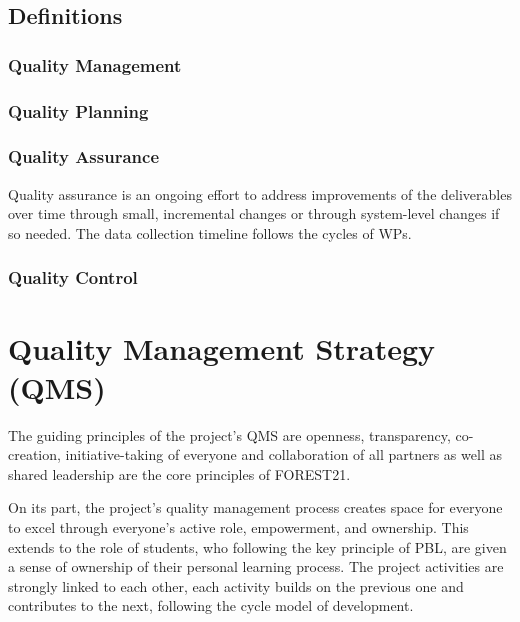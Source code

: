\documentclass[
  11pt,
]{article}
\begin{document}
\hypertarget{definitions}{%
\subsection{Definitions}\label{definitions}}

\hypertarget{quality-management}{%
\subsubsection{Quality Management}\label{quality-management}}

\hypertarget{quality-planning}{%
\subsubsection{Quality Planning}\label{quality-planning}}

\hypertarget{quality-assurance}{%
\subsubsection{Quality Assurance}\label{quality-assurance}}

Quality assurance is an ongoing effort to address improvements of the
deliverables over time through small, incremental changes or through
system-level changes if so needed. The data collection timeline follows
the cycles of WPs.

\hypertarget{quality-control}{%
\subsubsection{Quality Control}\label{quality-control}}

\clearpage

\hypertarget{quality-management-strategy-qms}{%
\section{Quality Management Strategy
(QMS)}\label{quality-management-strategy-qms}}

The guiding principles of the project's QMS are openness, transparency,
co-creation, initiative-taking of everyone and collaboration of all
partners as well as shared leadership are the core principles of
FOREST21.

On its part, the project's quality management process creates space for
everyone to excel through everyone's active role, empowerment, and
ownership. This extends to the role of students, who following the key
principle of PBL, are given a sense of ownership of their personal
learning process. The project activities are strongly linked to each
other, each activity builds on the previous one and contributes to the
next, following the cycle model of development.
\end{document}
